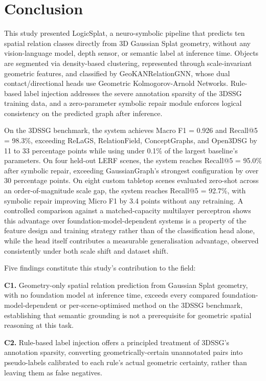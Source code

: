 \documentclass[sn-mathphys,Numbered]{sn-jnl}
\begin{document}
\FloatBarrier
\section{Conclusion}\label{sec6}

This study presented LogicSplat, a neuro-symbolic pipeline that predicts ten spatial relation classes directly from 3D Gaussian Splat geometry, without any vision-language model, depth sensor, or semantic label at inference time. Objects are segmented via density-based clustering, represented through scale-invariant geometric features, and classified by GeoKANRelationGNN, whose dual contact/directional heads use Geometric Kolmogorov-Arnold Networks. Rule-based label injection addresses the severe annotation sparsity of the 3DSSG training data, and a zero-parameter symbolic repair module enforces logical consistency on the predicted graph after inference.

On the 3DSSG benchmark, the system achieves Macro F1 = 0.926 and Recall@5 = 98.3\%, exceeding ReLaGS, RelationField, ConceptGraphs, and Open3DSG by 11 to 33 percentage points while using under 0.1\% of the largest baseline's parameters. On four held-out LERF scenes, the system reaches Recall@5 = 95.0\% after symbolic repair, exceeding GaussianGraph's strongest configuration by over 30 percentage points. On eight custom tabletop scenes evaluated zero-shot across an order-of-magnitude scale gap, the system reaches Recall@5 = 92.7\%, with symbolic repair improving Micro F1 by 3.4 points without any retraining. A controlled comparison against a matched-capacity multilayer perceptron shows this advantage over foundation-model-dependent systems is a property of the feature design and training strategy rather than of the classification head alone, while the head itself contributes a measurable generalisation advantage, observed consistently under both scale shift and dataset shift.

Five findings constitute this study's contribution to the field:

\textbf{C1.} Geometry-only spatial relation prediction from Gaussian Splat geometry, with no foundation model at inference time, exceeds every compared foundation-model-dependent or per-scene-optimised method on the 3DSSG benchmark, establishing that semantic grounding is not a prerequisite for geometric spatial reasoning at this task.

\textbf{C2.} Rule-based label injection offers a principled treatment of 3DSSG's annotation sparsity, converting geometrically-certain unannotated pairs into pseudo-labels calibrated to each rule's actual geometric certainty, rather than leaving them as false negatives.
\end{document}
